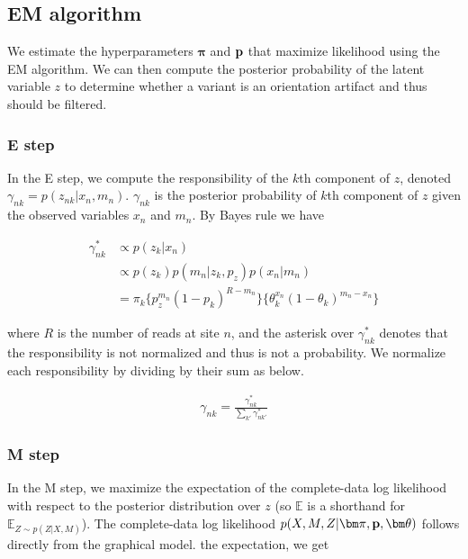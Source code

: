 \documentclass[a4paper]{article}
\newcommand{\vp}{{\bf p}}
\newcommand{\vpi}{{\bm \pi}}
\newcommand{\vtheta}{{\bm \theta}}
\newcommand{\E}{\mathbb{E}}
\begin{document}

\subsection{EM algorithm}
We estimate the hyperparameters $\vpi$ and $\vp$ that maximize likelihood using the EM algorithm. We can then compute the posterior probability of the latent variable $z$ to determine whether a variant is an orientation artifact and thus should be filtered.

\subsubsection{E step}
In the E step, we compute the responsibility of the $k$th component of $z$, denoted $\gamma_{nk} = p(z_{nk} | x_n, m_n)$. $\gamma_{nk}$ is the posterior probability of $k$th component of $z$ given the observed variables $x_n$ and $m_n$. By Bayes rule we have

\begin{align}
\gamma^*_{nk} &\propto p(z_{k} | x_n) \nonumber \\
		        &\propto p(z_{k}) p(m_n | z_k, p_{z} ) p(x_n | m_n ) \nonumber \\
		        &= \pi_k  \{ p_{z}^{m_n} (1-p_k)^{R - m_n} \} \{ \theta_k^{x_n} (1 - \theta_k)^{m_n - x_n} \}
\end{align}

where $R$ is the number of reads at site $n$, and the asterisk over $\gamma^*_{nk}$ denotes that the responsibility is not normalized and thus is not a probability. We normalize each responsibility by dividing by their sum as below.

\begin{align}
\gamma_{nk} = \frac{\gamma^*_{nk}}{\sum_{k'} \gamma^*_{nk'}}
\end{align}

\subsubsection{M step}
In the M step, we maximize the expectation of the complete-data log likelihood with respect to the posterior distribution over $z$ (so $\E$ is a shorthand for $\E_{Z \sim p(Z|X,M)}$). The complete-data log likelihood $p(X, M, Z | \vpi, \vp, \vtheta)$ follows directly from the graphical model. the expectation, we get
\end{document}
